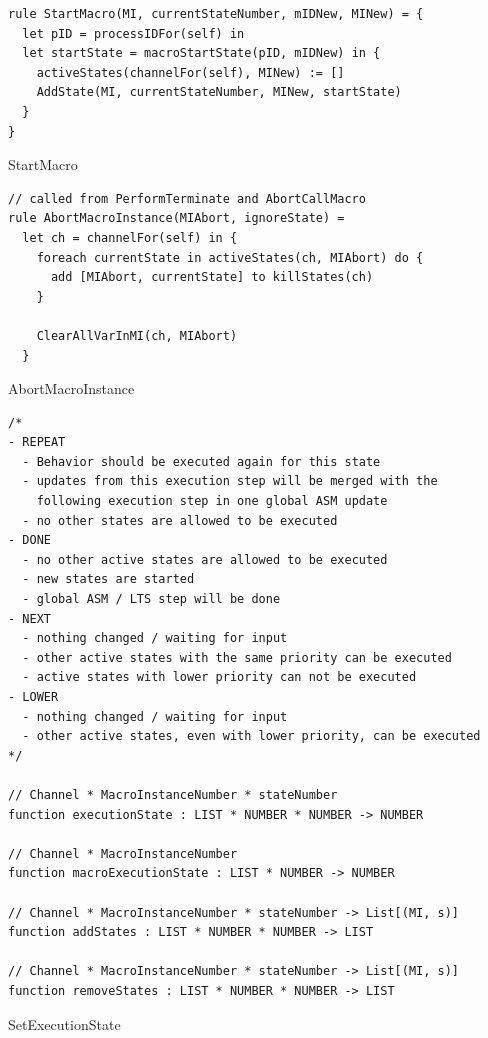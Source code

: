 \begin{listing}[H]
\begin{verbatim}
rule StartMacro(MI, currentStateNumber, mIDNew, MINew) = {
  let pID = processIDFor(self) in
  let startState = macroStartState(pID, mIDNew) in {
    activeStates(channelFor(self), MINew) := []
    AddState(MI, currentStateNumber, MINew, startState)
  }
}
\end{verbatim}
\caption{StartMacro}
\label{lst:asm:StartMacro}
\end{listing}


\begin{listing}[H]
\begin{verbatim}
// called from PerformTerminate and AbortCallMacro
rule AbortMacroInstance(MIAbort, ignoreState) =
  let ch = channelFor(self) in {
    foreach currentState in activeStates(ch, MIAbort) do {
      add [MIAbort, currentState] to killStates(ch)
    }

    ClearAllVarInMI(ch, MIAbort)
  }
\end{verbatim}
\caption{AbortMacroInstance}
\label{lst:asm:AbortMacroInstance}
\end{listing}



\begin{listing}[H]
\begin{verbatim}
/*
- REPEAT
  - Behavior should be executed again for this state
  - updates from this execution step will be merged with the
    following execution step in one global ASM update
  - no other states are allowed to be executed
- DONE
  - no other active states are allowed to be executed
  - new states are started
  - global ASM / LTS step will be done
- NEXT
  - nothing changed / waiting for input
  - other active states with the same priority can be executed
  - active states with lower priority can not be executed
- LOWER
  - nothing changed / waiting for input
  - other active states, even with lower priority, can be executed
*/

// Channel * MacroInstanceNumber * stateNumber
function executionState : LIST * NUMBER * NUMBER -> NUMBER

// Channel * MacroInstanceNumber
function macroExecutionState : LIST * NUMBER -> NUMBER

// Channel * MacroInstanceNumber * stateNumber -> List[(MI, s)]
function addStates : LIST * NUMBER * NUMBER -> LIST

// Channel * MacroInstanceNumber * stateNumber -> List[(MI, s)]
function removeStates : LIST * NUMBER * NUMBER -> LIST
\end{verbatim}
\caption{SetExecutionState}
\label{lst:asm:SetExecutionState}
\end{listing}




